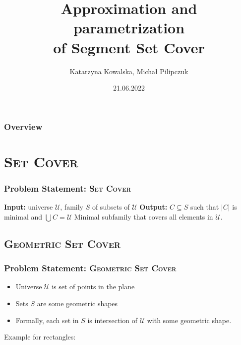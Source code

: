 \documentclass{beamer}
\title[Segment Set Cover]{Approximation and parametrization\\
of Segment Set Cover}
\author{Katarzyna Kowalska, Michał Pilipczuk} %
\institute[UW] %
{
University of Warsaw, MIMUW \\ %
\medskip
\textit{kk371053@students.mimuw.edu.pl} %
}
\date{21.06.2022} %
\begin{document}
\begin{frame}
\titlepage %
\end{frame}

\begin{frame}
\frametitle{Overview} %
\tableofcontents %
\end{frame}



\section{\textsc{Set Cover}}
\begin{frame}
\frametitle{Problem Statement: \textsc{Set Cover}}
\textbf{Input:} universe $\mathcal{U}$,
family $S$ of subsets of $\mathcal{U}$
\newline
\textbf{Output:} $C \subseteq S$ such that $|C|$ is minimal and
$\bigcup C = \mathcal{U}$
\newline
Minimal subfamily that covers all elements in $\mathcal{U}$.



\end{frame}
\subsection{\textsc{Geometric Set Cover}}

\begin{frame}
\frametitle{Problem Statement: \textsc{Geometric Set Cover}}
\begin{itemize}
\item Universe $\mathcal{U}$ is set of points in the plane
\item Sets $S$ are some geometric shapes
\item Formally, each set in $S$ is intersection of $\mathcal{U}$
with some geometric shape.
\end{itemize}

Example for rectangles:




\end{frame}
\end{document}
